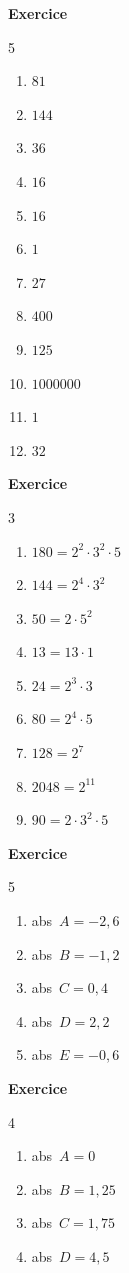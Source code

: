 \documentclass[10pt,a4paper]{article}
\newcounter{nexo}
\begin{document}
\textbf{Exercice \thenexo} 
\begin{multicols}{5}
	\begin{enumerate}[label=\alph*)]
		\item $81$
		\item $144$
		\item $36$
		\item $16$
		\item $16$
		\item $1$
		\item $27$
		\item $400$
		\item $125$
		\item $1 000 000$
		\item $1$
		\item $32$
	\end{enumerate}
\end{multicols}
\textbf{Exercice \thenexo} 
\begin{multicols}{3}
	\begin{enumerate}[label=\alph*)]
		\item $180=2^2 \cdot 3^2 \cdot 5$
		\item $144=2^4 \cdot 3^2$
		\item $50=2\cdot 5^2$
		\item $13=13\cdot 1$
		\item $24=2^3 \cdot 3$
		\item $80=2^4\cdot 5$
		\item $128=2^7$
		\item $2048=2^{11}$
		\item $90=2\cdot 3^2 \cdot 5$
	\end{enumerate}
\end{multicols}
\textbf{Exercice \thenexo} 
\begin{multicols}{5}
	\begin{enumerate}[label=\alph*)]
		\item abs~$A=-2,6$ 
		\item abs~$B=-1,2$ 
		\item abs~$C=0,4$ 
		\item abs~$D=2,2$ 
		\item abs~$E=-0,6$ 
	\end{enumerate}
\end{multicols}
\textbf{Exercice \thenexo} 
\begin{multicols}{4}
	\begin{enumerate}[label=\alph*)]
		\item abs~$A=0$
		\item abs~$B=1,25$
		\item abs~$C=1,75$
		\item abs~$D=4,5$
	\end{enumerate}
\end{multicols}
\end{document}
